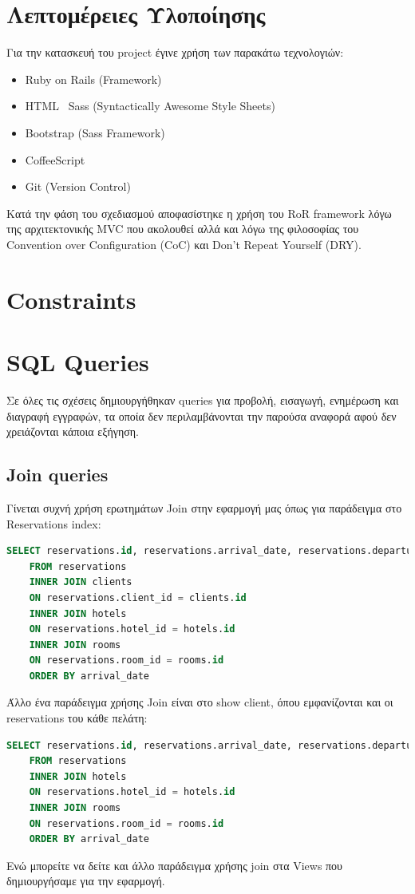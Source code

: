 \documentclass[a4paper,12pt]{article}
\begin{document}
\section{Λεπτομέρειες Υλοποίησης}
Για την κατασκευή του project έγινε χρήση των παρακάτω τεχνολογιών:
\begin{itemize}
  \item Ruby on Rails (Framework)
  \item HTML \ Sass (Syntactically Awesome Style Sheets) 
  \item Bootstrap (Sass Framework)
  \item CoffeeScript
  \item Git (Version Control)
\end{itemize}

Κατά την φάση του σχεδιασμού αποφασίστηκε η χρήση του RoR framework λόγω της αρχιτεκτονικής MVC που ακολουθεί αλλά και λόγω της φιλοσοφίας του Convention over Configuration (CoC) και Don't Repeat Yourself (DRY).

\section{Constraints}

\section{SQL Queries}
Σε όλες τις σχέσεις δημιουργήθηκαν queries για προβολή, εισαγωγή, ενημέρωση και διαγραφή εγγραφών, τα οποία δεν περιλαμβάνονται την παρούσα αναφορά αφού δεν χρειάζονται κάποια εξήγηση.

	\subsection{Join queries}
	Γίνεται συχνή χρήση ερωτημάτων Join στην εφαρμογή μας όπως για παράδειγμα στο Reservations index:
	\begin{lstlisting}[language=SQL]
	SELECT reservations.id, reservations.arrival_date, reservations.departure_date, reservations.created_at, reservations.updated_at, clients.first_name, clients.last_name, hotels.name, rooms.room_type
	FROM reservations
	INNER JOIN clients
	ON reservations.client_id = clients.id
	INNER JOIN hotels
	ON reservations.hotel_id = hotels.id
	INNER JOIN rooms
	ON reservations.room_id = rooms.id
	ORDER BY arrival_date
	\end{lstlisting}
	Άλλο ένα παράδειγμα χρήσης Join είναι στο show client, όπου εμφανίζονται και οι reservations του κάθε πελάτη:
	\begin{lstlisting}[language=SQL]
	SELECT reservations.id, reservations.arrival_date, reservations.departure_date, reservations.created_at, reservations.updated_at, hotels.name, rooms.room_type
	FROM reservations
	INNER JOIN hotels
	ON reservations.hotel_id = hotels.id
	INNER JOIN rooms
	ON reservations.room_id = rooms.id
	ORDER BY arrival_date
	\end{lstlisting}
	Ενώ μπορείτε να δείτε και άλλο παράδειγμα χρήσης join στα Views που δημιουργήσαμε για την εφαρμογή.
	
\end{document}
